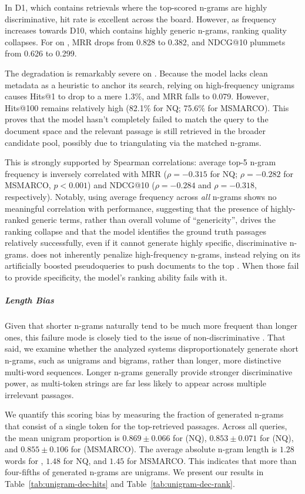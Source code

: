 In D1, which contains retrievals where the top-scored n-grams are highly discriminative, hit rate is excellent across the board. However, as frequency increases towards D10, which contains highly generic n-grams, ranking quality collapses. For  on , MRR drops from 0.828 to 0.382, and NDCG@10 plummets from 0.626 to 0.299. 

The degradation is remarkably severe on . Because the model lacks clean metadata as a heuristic to anchor its search, relying on high-frequency unigrams causes Hits@1 to drop to a mere 1.3\%, and MRR falls to 0.079. However, Hits@100 remains relatively high (82.1\% for NQ; 75.6\% for MSMARCO). This proves that the  model hasn't completely failed to match the query to the document space and the relevant passage is still retrieved in the broader candidate pool, possibly due to triangulating via the matched n-grams. 

This is strongly supported by Spearman correlations: average top-5 n-gram frequency is inversely correlated with MRR ($\rho = -0.315$ for  NQ; $\rho = -0.282$ for  MSMARCO, $p<0.001$) and NDCG@10 ($\rho = -0.284$ and $\rho = -0.318$, respectively). Notably, using average frequency across \textit{all} n-grams shows no meaningful correlation with performance, suggesting that the presence of highly-ranked generic terms, rather than overall volume of ``genericity'', drives the ranking collapse and that the model identifies the ground truth passages relatively successfully, even if it cannot generate highly specific, discriminative n-grams.  does not inherently penalize high-frequency n-grams, instead relying on its artificially boosted pseudoqueries to push documents to the top \cite{yongqi-li-multiview-identifiers}. When those fail to provide specificity, the model's ranking ability fails with it.


\subparagraph{Length Bias}
\label{par:len-bias}
Given that shorter n-grams naturally tend to be much more frequent than longer ones, this failure mode is closely tied to the issue of non-discriminative . That said, we examine whether the analyzed systems disproportionately generate short n-grams, such as unigrams and bigrams, rather than longer, more distinctive multi-word sequences. Longer n-grams generally provide stronger discriminative power, as multi-token strings are far less likely to appear across multiple irrelevant passages.

We quantify this scoring bias by measuring the fraction of generated n-grams that consist of a single token for the top-retrieved passages. Across all queries, the mean unigram proportion is $0.869 \pm 0.066$ for  (NQ), $0.853 \pm 0.071$ for  (NQ), and $0.855 \pm 0.106$ for  (MSMARCO). The average absolute n-gram length is $1.28$ words for , $1.48$ for  NQ, and $1.45$ for  MSMARCO. This indicates that more than four-fifths of generated n-grams are unigrams. We present our results in Table~\ref{tab:unigram-dec-hits} and Table~\ref{tab:unigram-dec-rank}.


